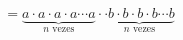 \documentclass[preview]{standalone}
\begin{document}
\begin{align*}
= \underbrace{a\cdot a \cdot a\cdot a \cdots a}_{n \text{ vezes}}\cdot \underbrace{\cdot b \cdot b\cdot b \cdot b\cdots b }_{n \text{ vezes}}
\end{align*}
\end{document}

